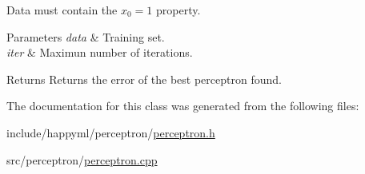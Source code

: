 Data must contain the $x_0 = 1$ property.


\begin{DoxyParams}{Parameters}
{\em data} & Training set. \\
\hline
{\em iter} & Maximun number of iterations.\\
\hline
\end{DoxyParams}
\begin{DoxyReturn}{Returns}
Returns the error of the best perceptron found. 
\end{DoxyReturn}


The documentation for this class was generated from the following files\+:\begin{DoxyCompactItemize}
\item 
include/happyml/perceptron/\hyperlink{perceptron_8h}{perceptron.\+h}\item 
src/perceptron/\hyperlink{perceptron_8cpp}{perceptron.\+cpp}\end{DoxyCompactItemize}
